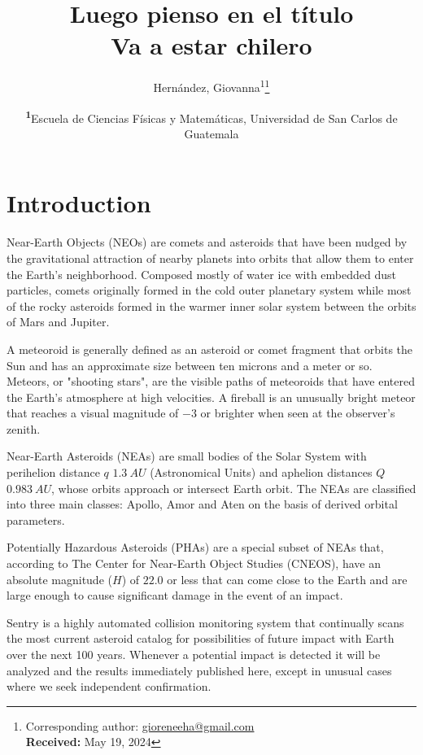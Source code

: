 \documentclass[
	a4paper, %
	10pt, %
	unnumberedsections, %
	twoside, %
]{LTJournalArticle}
\title{Luego pienso en el título\\ Va a estar chilero} %
\author{%
	Hernández, Giovanna\textsuperscript{1}\thanks{Corresponding author: \href{mailto:gioreneeha@gmail.com}{gioreneeha@gmail.com}\\ \textbf{Received:} May 19, 2024}
}
\date{\footnotesize\textsuperscript{\textbf{1}}Escuela de Ciencias Físicas y Matemáticas, Universidad de San Carlos de Guatemala}
\begin{document}
\maketitle %


\section{Introduction}

Near-Earth Objects (NEOs) are comets and asteroids that have been nudged by the gravitational
attraction of nearby planets into orbits that allow them to enter the Earth’s neighborhood. Composed
mostly of water ice with embedded dust particles, comets originally formed in the cold outer planetary
system while most of the rocky asteroids formed in the warmer inner solar system between the orbits of
Mars and Jupiter.  \supercite{nasaBasics}

A meteoroid is generally defined as an asteroid or comet fragment that orbits the Sun and has an
approximate size between ten microns and a meter or so. Meteors, or "shooting stars", are the visible
paths of meteoroids that have entered the Earth’s atmosphere at high velocities. A fireball is an
unusually bright meteor that reaches a visual magnitude of $-3$ or brighter when seen at the observer’s
zenith. \supercite{nasaFireballs}

Near-Earth Asteroids (NEAs) are small bodies of the Solar System with perihelion distance $q$
$1.3\:AU$ (Astronomical Units) and aphelion distances $Q$ $0.983\:AU$, whose orbits approach or
intersect Earth orbit. The NEAs are classified into three main classes: Apollo, Amor and Aten on the
basis of derived orbital parameters. \supercite{rukmini2016statistical}

Potentially Hazardous Asteroids (PHAs) are a special subset of NEAs that, according to The Center for
Near-Earth Object Studies (CNEOS), have an absolute magnitude ($H$) of $22.0$ or less that can come
close to the Earth and are large enough to cause significant damage in the event of an impact. \supercite{zhou2024martians}

Sentry is a highly automated collision monitoring system that continually scans the most current
asteroid catalog for possibilities of future impact with Earth over the next 100 years. Whenever a
potential impact is detected it will be analyzed and the results immediately published here, except
in unusual cases where we seek independent confirmation. \supercite{nasaSentryEarth}
\end{document}
